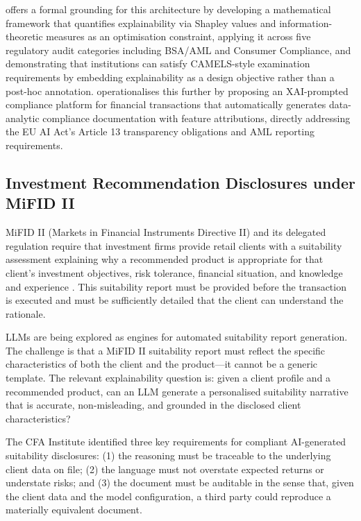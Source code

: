 \citet{Desai2024} offers a formal grounding for this architecture by developing a
mathematical framework that quantifies explainability via Shapley values and
information-theoretic measures as an optimisation constraint, applying it across five
regulatory audit categories including BSA/AML and Consumer Compliance, and demonstrating
that institutions can satisfy CAMELS-style examination requirements by embedding
explainability as a design objective rather than a post-hoc annotation. \citet{Lakarasu2024} operationalises this further by proposing an XAI-prompted compliance
platform for financial transactions that automatically generates data-analytic compliance
documentation with feature attributions, directly addressing the EU AI Act's Article 13
transparency obligations and AML reporting requirements.

\subsection{Investment Recommendation Disclosures under MiFID II}
\label{sec:ch12-mifid-disclosures}

MiFID II (Markets in Financial Instruments Directive II) and its delegated regulation
require that investment firms provide retail clients with a suitability assessment
explaining why a recommended product is appropriate for that client's investment
objectives, risk tolerance, financial situation, and knowledge and experience
\cite{esma2018mifid2}. This suitability report must be provided before the transaction
is executed and must be sufficiently detailed that the client can understand the
rationale.

LLMs are being explored as engines for automated suitability report generation. The
challenge is that a MiFID II suitability report must reflect the specific
characteristics of both the client and the product---it cannot be a generic template.
The relevant explainability question is: given a client profile and a recommended product,
can an LLM generate a personalised suitability narrative that is accurate,
non-misleading, and grounded in the disclosed client characteristics?

The CFA Institute \cite{cfainstitute2025xai} identified three key requirements for compliant AI-generated suitability disclosures:
(1) the reasoning must be traceable to the underlying client data on file; (2) the
language must not overstate expected returns or understate risks; and (3) the document
must be auditable in the sense that, given the client data and the model configuration,
a third party could reproduce a materially equivalent document.

